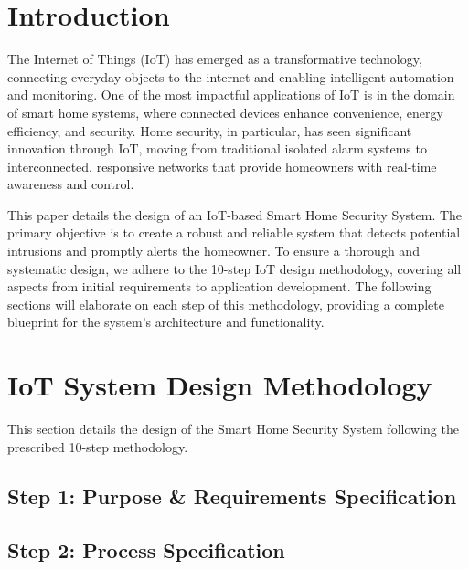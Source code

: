 \documentclass[conference]{IEEEtran}
\begin{document}

\section{Introduction}

The Internet of Things (IoT) has emerged as a transformative technology, connecting everyday objects to the internet and enabling intelligent automation and monitoring. One of the most impactful applications of IoT is in the domain of smart home systems, where connected devices enhance convenience, energy efficiency, and security. Home security, in particular, has seen significant innovation through IoT, moving from traditional isolated alarm systems to interconnected, responsive networks that provide homeowners with real-time awareness and control.

This paper details the design of an IoT-based Smart Home Security System. The primary objective is to create a robust and reliable system that detects potential intrusions and promptly alerts the homeowner. To ensure a thorough and systematic design, we adhere to the 10-step IoT design methodology, covering all aspects from initial requirements to application development. The following sections will elaborate on each step of this methodology, providing a complete blueprint for the system's architecture and functionality.


\section{IoT System Design Methodology}
This section details the design of the Smart Home Security System following the prescribed 10-step methodology.

\subsection{Step 1: Purpose \& Requirements Specification}

\subsection{Step 2: Process Specification}
\end{document}
